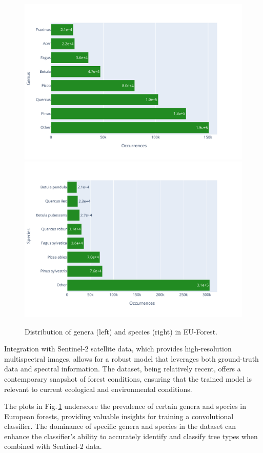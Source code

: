 \begin{figure}[!thb]
    \centering

    \includegraphics[width=0.48\linewidth, trim={0 0 2cm 0}]{figures/figures_labels/genus_cutoff.pdf}
    \includegraphics[width=0.48\linewidth, trim={0 0 2cm 0}]{figures/figures_labels/species_cutoff.pdf}

    \caption{Distribution of genera (left) and species (right) in EU-Forest.}
    \label{fig:cutoff_barplots}
\end{figure}

Integration with Sentinel-2 satellite data, which provides high-resolution multispectral images, 
allows for a robust model that leverages both ground-truth data and spectral information.
The dataset, being relatively recent, offers a contemporary snapshot of forest conditions, 
ensuring that the trained model is relevant to current ecological and environmental conditions. 

The plots in Fig.\,\ref{fig:cutoff_barplots} underscore the prevalence of certain genera and species 
in European forests, providing valuable insights for training a convolutional classifier.
The dominance of specific genera and species in the dataset can enhance the classifier's 
ability to accurately identify and classify tree types when combined with Sentinel-2 data.


